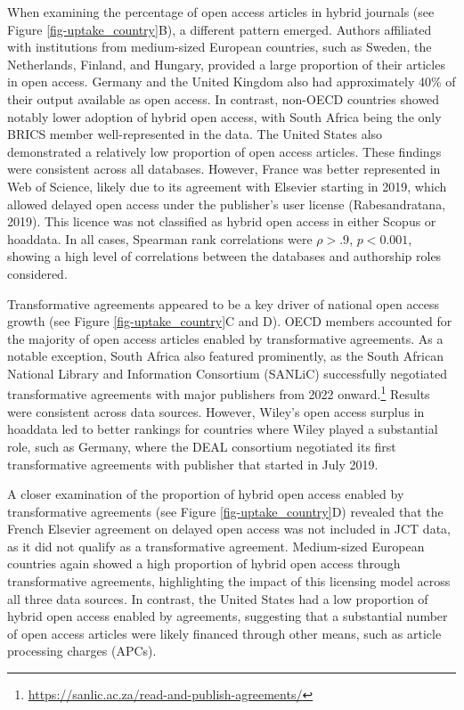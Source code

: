 \documentclass[a4paper,man,floatsintext,longtable,noextraspace,10pt]{apa6}
\begin{document}
When examining the percentage of open access articles in hybrid journals
(see Figure \ref{fig-uptake_country}B), a different pattern emerged.
Authors affiliated with institutions from medium-sized European
countries, such as Sweden, the Netherlands, Finland, and Hungary,
provided a large proportion of their articles in open access. Germany
and the United Kingdom also had approximately 40\% of their output
available as open access. In contrast, non-OECD countries showed notably
lower adoption of hybrid open access, with South Africa being the only
BRICS member well-represented in the data. The United States also
demonstrated a relatively low proportion of open access articles. These
findings were consistent across all databases. However, France was
better represented in Web of Science, likely due to its agreement with
Elsevier starting in 2019, which allowed delayed open access under the
publisher's user license (Rabesandratana, 2019). This licence was not
classified as hybrid open access in either Scopus or hoaddata. In all
cases, Spearman rank correlations were \(\rho > .9\), \(p < 0.001\),
showing a high level of correlations between the databases and
authorship roles considered.

Transformative agreements appeared to be a key driver of national open
access growth (see Figure \ref{fig-uptake_country}C and D). OECD members
accounted for the majority of open access articles enabled by
transformative agreements. As a notable exception, South Africa also
featured prominently, as the South African National Library and
Information Consortium (SANLiC) successfully negotiated transformative
agreements with major publishers from 2022 onward.\footnote{\url{https://sanlic.ac.za/read-and-publish-agreements/}}
Results were consistent across data sources. However, Wiley's open
access surplus in hoaddata led to better rankings for countries where
Wiley played a substantial role, such as Germany, where the DEAL
consortium negotiated its first transformative agreements with publisher
that started in July 2019.

A closer examination of the proportion of hybrid open access enabled by
transformative agreements (see Figure \ref{fig-uptake_country}D)
revealed that the French Elsevier agreement on delayed open access was
not included in JCT data, as it did not qualify as a transformative
agreement. Medium-sized European countries again showed a high
proportion of hybrid open access through transformative agreements,
highlighting the impact of this licensing model across all three data
sources. In contrast, the United States had a low proportion of hybrid
open access enabled by agreements, suggesting that a substantial number
of open access articles were likely financed through other means, such
as article processing charges (APCs).
\end{document}
